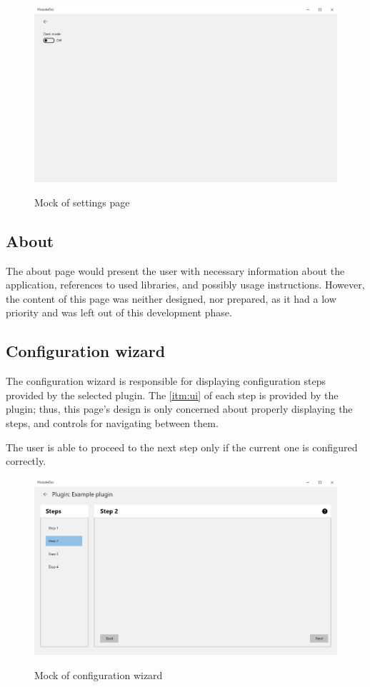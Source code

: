 \begin{figure}[H]
    \includegraphics[width=\linewidth]{img/mockSettings.png}
    \label{fig:settingsPage}
    \caption{Mock of settings page}
\end{figure}

\subsection{About}

The about page would present the user with necessary information about the application, references to used libraries, and possibly usage instructions. However, the content of this page was neither designed, nor prepared, as it had a low priority and was left out of this development phase.

\subsection{Configuration wizard}

The configuration wizard is responsible for displaying configuration steps provided by the selected plugin. The \ref{itm:ui} of each step is provided by the plugin; thus, this page's design is only concerned about properly displaying the steps, and controls for navigating between them.

The user is able to proceed to the next step only if the current one is configured correctly.

\begin{figure}[H]
    \includegraphics[width=\linewidth]{img/mockConfigurator.png}
    \label{fig:configuratorPage}
    \caption{Mock of configuration wizard}
\end{figure}

